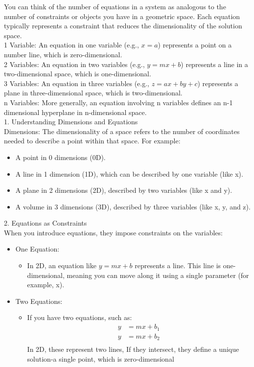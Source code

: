 \documentclass{article}
\begin{document}
You can think of the number of equations in a system as analogous to the number of constraints or objects you have in a geometric space. Each equation typically represents a constraint that reduces the dimensionality of the solution space.\\

1 Variable: An equation in one variable (e.g., $x=a$) represents a point on a number line, which is zero-dimensional.\\
2 Variables: An equation in two variables (e.g., $y=mx+b$) represents a line in a two-dimensional space, which is one-dimensional.\\
3 Variables: An equation in three variables (e.g., $z=ax+by+c$) represents a plane in three-dimensional space, which is two-dimensional.\\
n Variables: More generally, an equation involving n variables defines an n-1 dimensional hyperplane in n-dimensional space.\\

1. Understanding Dimensions and Equations\\
Dimensions: The dimensionality of a space refers to the number of coordinates needed to describe a point within that space. For example:
\begin{itemize}
\item A point in 0 dimensions (0D).
\item A line in 1 dimension (1D), which can be described by one variable (like x).
\item A plane in 2 dimensions (2D), described by two variables (like x and y).
\item A volume in 3 dimensions (3D), described by three variables (like x, y, and z).
\end{itemize}

2. Equations as Constraints\\
When you introduce equations, they impose constraints on the variables:
\begin{itemize}
\item One Equation:
	\begin{itemize}
	\item In 2D, an equation like $y = mx + b$ represents a line. This line is one-dimensional, meaning you can move along it using a single parameter (for example, x).
	\end{itemize}
\item Two Equations:
	\begin{itemize}
	\item If you have two equations, such as:
	\begin{align*}
	y &= mx + b_1\\
	y &= mx + b_2\\
	\end{align*}
	In 2D, these represent two lines, If they intersect, they define a unique solution-a single point, which is zero-dimensional
	\end{itemize}
\end{itemize}
\end{document}

